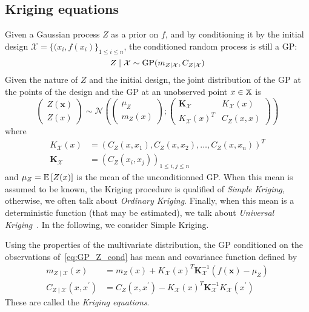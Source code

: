 \documentclass[../../Main_ManuscritThese.tex]{subfiles}
\begin{document}
\subsection{Kriging equations}
\label{sec:linear_estimation}
Given a Gaussian process $Z$ as a prior on $f$, and by conditioning it by the initial design $\mathcal{X} = \{(x_i, f(x_i)\}_{1 \leq i \leq n}$, the conditioned random process is still a GP:
\begin{equation}
  \label{eq:GP_Z_cond}
  Z \mid \mathcal{X} \sim \operatorname{\mathrm{GP}}(m_{Z\mid \mathcal{X}}, C_{Z\mid \mathcal{X}})
\end{equation}
Given the nature of $Z$ and the initial design, the joint distribution of the GP at the points of the design and the GP at an unobserved point $x \in \mathbb{X}$ is
\begin{equation}
  \label{eq:GP_joint_distrib}
  \begin{pmatrix}
    Z(\mathbf{x}) \\
    Z(x)
  \end{pmatrix} \sim
  \mathcal{N}\left(
    \begin{pmatrix}
      \mu_Z \\
      m_{Z}(x)
    \end{pmatrix} ;
    \begin{pmatrix}
      \mathbf{K}_{\mathcal{X}} & K_{\mathcal{X}}(x) \\
       K_{\mathcal{X}}(x)^T & C_Z(x, x)
    \end{pmatrix}
\right)
\end{equation}
where
\begin{align}
  K_{\mathcal{X}}(x) &= \left(C_Z(x, x_1),C_Z(x, x_2),\dots,C_Z(x,x_n)\right)^T \\
  \mathbf{K}_{\mathcal{X}} &= \left(C_Z(x_i, x_j)\right)_{1 \leq i,j \leq n}
\end{align}
and $\mu_Z = \mathbb{E}\left[Z(x)\right]$ is the mean of the unconditionned GP. When this mean is assumed to be known, the Kriging procedure is qualified of \emph{Simple Kriging}, otherwise, we often talk about \emph{Ordinary Kriging}. Finally, when this mean is a deterministic function (that may be estimated), we talk about \emph{Universal Kriging}~\cite{le_riche_introduction_2014}. In the following, we consider Simple Kriging.

Using the properties of the multivariate distribution, the GP conditioned on the observations of~\eqref{eq:GP_Z_cond} has mean and covariance function defined by
\begin{align}
  m_{Z \mid \mathcal{X}}(x) &= m_Z(x) + K_{\mathcal{X}}(x)^T \mathbf{K}_{\mathcal{X}}^{-1}(f(\mathbf{x}) - \mu_Z ) \\
  C_{Z\mid \mathcal{X}}(x, x^\prime) &= C_Z(x, x^\prime)  - K_{\mathcal{X}}(x)^T\mathbf{K}_{\mathcal{X}}^{-1}K_{\mathcal{X}}(x^\prime)
\end{align}
These are called the \emph{Kriging equations}.
\end{document}
